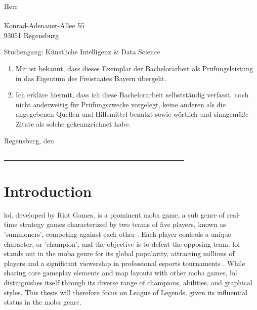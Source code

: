\documentclass[12pt, a4paper, headinclude, twoside, plainheadsepline, open=right, numbers=noenddot, hidelinks, toc=listof, toc=bibliography]{scrreprt}
\begin{document}
\noindent
Herr\\
\@author\\
Konrad-Adenauer-Allee 55\\
93051 Regensburg\\
\smallskip

\noindent
Studiengang: Künstliche Intelligenz \& Data Science
\bigskip

\begin{enumerate}
\item Mir ist bekannt, dass dieses Exemplar der Bachelorarbeit als Prüfungsleistung in das Eigentum des Freistaates Bayern übergeht.
\item Ich erkläre hiermit, dass ich diese Bachelorarbeit selbstständig verfasst, noch nicht anderweitig für Prüfungszwecke vorgelegt, keine anderen als die angegebenen Quellen und Hilfsmittel benutzt sowie wörtlich und sinngemäße Zitate als solche gekennzeichnet habe.
\end{enumerate}
\vspace{1cm}
Regensburg, den \@date\\
\medskip
\medskip

\noindent
\underline{~~~~~~~~~~~~~~~~~~~~~~~~~~~~~~~~~~~~~~~~~~~~~~~~~~~~}\\
\@author

\makeatother



\cleardoublepage
{}\tableofcontents 										%




\pagestyle{scrheadings} 																%
\cleardoublepage
{} 																	%

\chapter{Introduction}
\label{chap:intro}


\ac{lol}, developed by Riot Games, is a prominent \ac{moba} game, a sub genre of real-time strategy games characterized by two teams of five players, known as 'summoners', competing against each other \cite{mora-cantallopsMOBAGamesLiterature2018}. 
Each player controls a unique character, or 'champion', and the objective is to defeat the opposing team. 
\Ac{lol} stands out in the \ac{moba} genre for its global popularity, attracting millions of players and a significant viewership in professional esports tournaments \cite{goughLeagueLegendsChampionships}.
While sharing core gameplay elements and map layouts with other \ac{moba} games, \ac{lol} distinguishes itself through its diverse range of champions, abilities, and graphical styles. 
This thesis will therefore focus on League of Legends, given its influential status in the \ac{moba} genre. 
\end{document}
